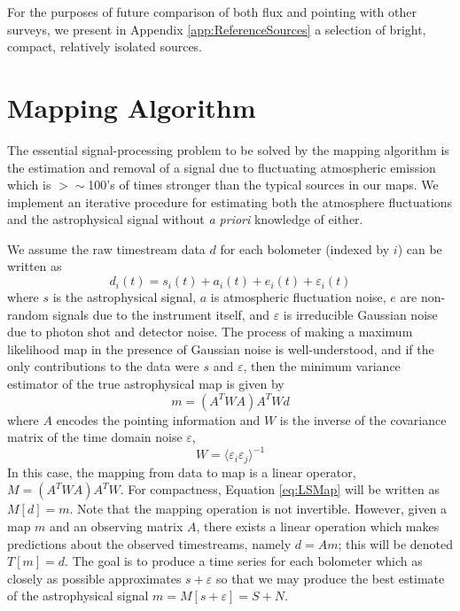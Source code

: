 \documentclass{emulateapj}
\newcommand{\epsi}{\varepsilon}
\begin{document}
For the purposes of future comparison of both flux and pointing with
other surveys, we present in Appendix \ref{app:ReferenceSources} a
selection of bright, compact, relatively isolated sources.


\section{Mapping Algorithm}
\label{sec:Mapping}

The essential signal-processing problem to be solved by the mapping
algorithm is the estimation and removal of a signal due to fluctuating
atmospheric emission which is $>\sim$100's of times stronger than the typical
sources in our maps.  We implement an iterative procedure for
estimating both the atmosphere fluctuations and the astrophysical
signal without {\it a priori} knowledge of either. 

We assume the raw timestream data $d$ for each bolometer (indexed by
$i$) can be written as
\begin{equation}
d_i(t) = s_i(t)+a_i(t)+e_i(t)+\epsi_i(t)
\end{equation}
where $s$ is the astrophysical signal, $a$ is atmospheric fluctuation
noise, $e$ are non-random signals due to the instrument itself, and
$\epsi$ is irreducible Gaussian noise due to photon shot and detector
noise.  The process of making a maximum likelihood map in the presence
of Gaussian noise is well-understood, and if the only contributions to
the data were $s$ and $\epsi$, then the minimum variance estimator of
the true astrophysical map is given by
\begin{equation}
\label{eq:LSMap}
m = (A^T W A) A^T W d
\end{equation}
where $A$ encodes the pointing information and $W$ is the inverse of
the covariance matrix of the time domain noise $\epsi$,
\begin{equation}
W = {\langle \epsi_i \epsi_j \rangle}^{-1}
\end{equation}
In this case, the mapping from data to map is a linear operator, $M
=(A^T W A) A^T W$.  For compactness, Equation \ref{eq:LSMap} will be
written as $M[d] = m$.  Note that the mapping operation is not
invertible.  However, given a map $m$ and an observing matrix $A$,
there exists a linear operation which makes predictions about the
observed timestreams, namely $d = A m$; this will be denoted $T[m] =
d$. The goal is to produce a time series for each bolometer which as
closely as possible approximates $s + \epsi$ so that we may produce
the best estimate of the astrophysical signal $m = M[s+\epsi] = S +
N$.
\end{document}
